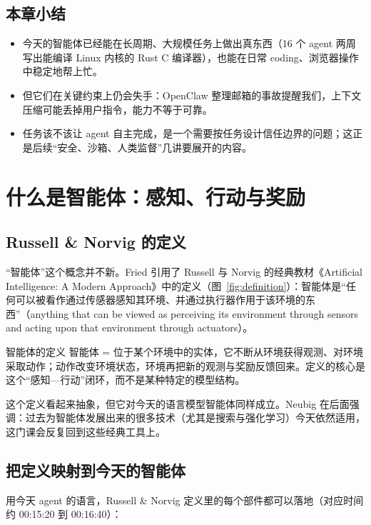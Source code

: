 \documentclass[a4paper]{article}
\begin{document}
\subsection{本章小结}

\begin{itemize}
\item 今天的智能体已经能在长周期、大规模任务上做出真东西（16 个 agent 两周写出能编译 Linux 内核的 Rust C 编译器），也能在日常 coding、浏览器操作中稳定地帮上忙。
\item 但它们在关键约束上仍会失手：OpenClaw 整理邮箱的事故提醒我们，上下文压缩可能丢掉用户指令，能力不等于可靠。
\item 任务该不该让 agent 自主完成，是一个需要按任务设计信任边界的问题；这正是后续“安全、沙箱、人类监督”几讲要展开的内容。
\end{itemize}

\section{什么是智能体：感知、行动与奖励}

\subsection{Russell \& Norvig 的定义}

“智能体”这个概念并不新。Fried 引用了 Russell 与 Norvig 的经典教材《Artificial Intelligence: A Modern Approach》中的定义（图~\ref{fig:definition}）：智能体是“任何可以被看作通过传感器感知其环境、并通过执行器作用于该环境的东西”（anything that can be viewed as perceiving its environment through sensors and acting upon that environment through actuators）。

\begin{importantbox}{智能体的定义}
智能体 = 位于某个环境中的实体，它不断从环境获得观测、对环境采取动作；动作改变环境状态，环境再把新的观测与奖励反馈回来。定义的核心是这个“感知—行动”闭环，而不是某种特定的模型结构。
\end{importantbox}

这个定义看起来抽象，但它对今天的语言模型智能体同样成立。Neubig 在后面强调：过去为智能体发展出来的很多技术（尤其是搜索与强化学习）今天依然适用，这门课会反复回到这些经典工具上。

\subsection{把定义映射到今天的智能体}

用今天 agent 的语言，Russell \& Norvig 定义里的每个部件都可以落地（对应时间约 00:15:20 到 00:16:40）：
\end{document}
